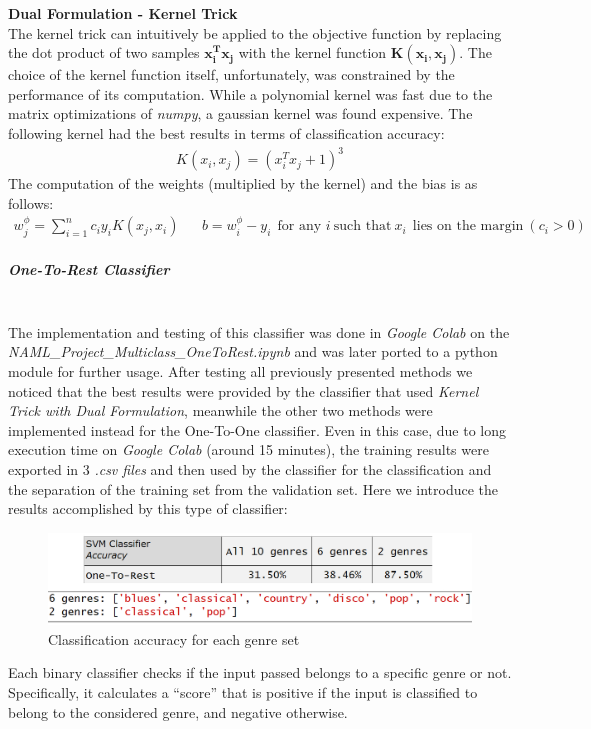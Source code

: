 \documentclass[12pt]{article}
\begin{document}
	\textbf{Dual Formulation - Kernel Trick}\\
	The kernel trick can intuitively be applied to the objective function by replacing the dot product of two samples $\mathbf{x_i^Tx_j}$ with the kernel function $\mathbf{K(x_i,x_j)}$. The choice of the kernel function itself, unfortunately, was constrained by the performance of its computation. While a polynomial kernel was fast due to the matrix optimizations of \textit{numpy}, a gaussian kernel was found expensive. The following kernel had the best results in terms of classification accuracy:
	\begin{align}
		K(x_i,x_j)=(x_i^Tx_j+1)^3
	\end{align}
	The computation of the weights (multiplied by the kernel) and the bias is as follows:
	\begin{align}
		w_j^\phi = \sum_{i=1}^n{c_iy_iK(x_j,x_i)}&&
		b = w^\phi_i-y_i \ \ \text{for any } i\ \text{such that}\ x_i\ \ \text{lies on the margin}\  (c_i>0)
	\end{align}
	\subparagraph{One-To-Rest Classifier}\mbox{}\\\newline
	The implementation and testing of this  classifier was done in \textit{Google Colab} on the\\ \textit{NAML\_Project\_Multiclass\_OneToRest.ipynb} and was later ported to a python module for further usage. After testing all previously presented methods we noticed that the best results were provided by the
	classifier that used \textit{Kernel Trick with Dual Formulation}, meanwhile the other two methods were implemented instead for the One-To-One classifier.
	Even in this case, due to long execution
	time on \textit{Google Colab} (around 15 minutes), the training results were exported in 3 \textit{.csv files} and then used by the classifier for the
	classification and the separation of the training set from the validation set. Here we introduce the results accomplished by this type of classifier:
	\begin{figure}[H]
		\hspace{70pt}\includegraphics[scale=0.5]{svm_otr_acc}
		\caption{Classification accuracy for each genre set}
	\end{figure}
	Each binary classifier checks if the input passed belongs to a specific genre or not. Specifically, it calculates a “score” that is positive if the input is classified to belong to the considered genre, and negative otherwise.
	
\end{document}
